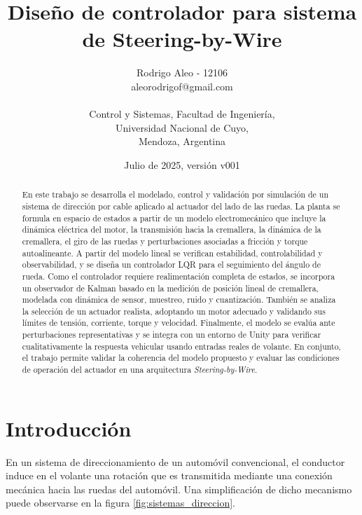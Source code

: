 \documentclass{article}
\title{Diseño de controlador para sistema de Steering-by-Wire}
\author{Rodrigo Aleo - 12106\\ aleorodrigof@gmail.com \\ \\ Control y Sistemas, Facultad de Ingeniería, \\ Universidad Nacional de Cuyo, \\ Mendoza, Argentina}
\date{Julio de 2025, versión v001}
\begin{document}
\renewcommand{\tablename}{Tabla}

\maketitle

\begin{abstract}
    En este trabajo se desarrolla el modelado, control y validación por simulación de un sistema de dirección por cable aplicado al actuador del lado de las ruedas. La planta se formula en espacio de estados a partir de un modelo electromecánico que incluye la dinámica eléctrica del motor, la transmisión hacia la cremallera, la dinámica de la cremallera, el giro de las ruedas y perturbaciones asociadas a fricción y torque autoalineante. A partir del modelo lineal se verifican estabilidad, controlabilidad y observabilidad, y se diseña un controlador LQR para el seguimiento del ángulo de rueda. Como el controlador requiere realimentación completa de estados, se incorpora un observador de Kalman basado en la medición de posición lineal de cremallera, modelada con dinámica de sensor, muestreo, ruido y cuantización. También se analiza la selección de un actuador realista, adoptando un motor adecuado y validando sus límites de tensión, corriente, torque y velocidad. Finalmente, el modelo se evalúa ante perturbaciones representativas y se integra con un entorno de Unity para verificar cualitativamente la respuesta vehicular usando entradas reales de volante. En conjunto, el trabajo permite validar la coherencia del modelo propuesto y evaluar las condiciones de operación del actuador en una arquitectura \textit{Steering-by-Wire}.
\end{abstract}

\section{Introducción}
\label{sec:intro}


En un sistema de direccionamiento de un automóvil convencional, el conductor induce en el volante una rotación que es transmitida mediante una conexión mecánica hacia las ruedas del automóvil. Una simplificación de dicho mecanismo puede observarse en la figura \ref{fig:sistemas_direccion}.
\end{document}
